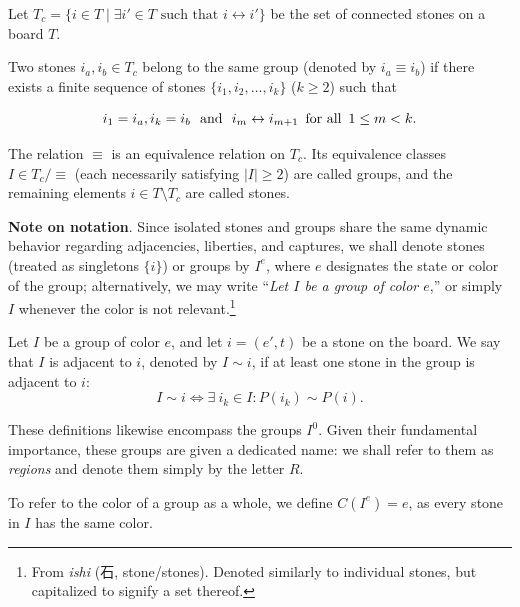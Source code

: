 \begin{definition}
	
	Let $T_c = \{i \in T \mid \exists i' \in T \text{ such that } i \leftrightarrow i'\}$ be the set of connected stones on a board $T$. 
	
	Two stones $i_a, i_b \in T_c$ belong to the same group (denoted by $i_a \equiv i_b$) if there exists a finite sequence of stones $\{i_1, i_2, \dots, i_k\}$ ($k \ge 2$) such that
	
$$i_1 = i_a, i_k = i_b \text{\,\, and \,\,} i_m \leftrightarrow i_{m+1} \text{\, for all \,} 1 \le m < k.$$
	
	The relation $\equiv$ is an equivalence relation on $T_c$. Its equivalence classes $I \in T_c / {\equiv}$ (each necessarily satisfying $\vert{}I\vert{} \ge 2$) are called groups, and the remaining elements $i \in T \setminus T_c$ are called stones. 
	
	
\end{definition}
	\textbf{Note on notation}. Since isolated stones and groups share the same dynamic behavior regarding adjacencies, liberties, and captures, we shall denote stones (treated as singletons $\{i\}$) or groups by $I^e$, where \(e\) designates the state or color of the group; alternatively, we may write ``\textit{Let \(I\) be a group of color \(e\)},'' or simply \(I\) whenever the color is not relevant.\footnote{From \textit{ishi} (石, stone/stones). Denoted similarly to individual stones, but capitalized to signify a set thereof.}
	
	

\begin{definition}
	Let $I$ be a group of color $e$, and let $i=(e',t)$ be a stone on the board. We say that $I$ is adjacent to $i$, denoted by $I \sim i$, if at least one stone in the group is adjacent to $i$:
	$$I \sim i \iff \exists \ i_k \in I : P(i_k) \sim P(i).$$
\end{definition}

These definitions likewise encompass the groups $I^{0}$. Given their fundamental importance, these groups are given a dedicated name: we shall refer to them as \textit{regions} and denote them simply by the letter $R$.

To refer to the color of a group as a whole, we define \(C(I^{e}) = e\), as every stone in $I$ has the same color.


